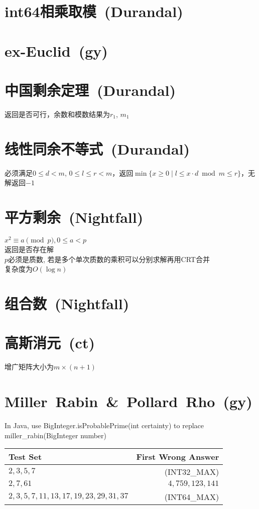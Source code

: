 \section{int64相乘取模\ \small(Durandal)}
\section{ex-Euclid\ \small(gy)}
\section{中国剩余定理\ \small(Durandal)}
	返回是否可行，余数和模数结果为$ r_1 $, $ m_1 $
\section{线性同余不等式\ \small(Durandal)}
	必须满足$ 0 \leq d < m $, $ 0 \leq l \leq r < m $，返回$ \min\lbrace x \geq 0 \mid l \leq x \cdot d \bmod m \leq r \rbrace $，无解返回$ -1 $ 
\section{平方剩余\ \small(Nightfall)}
	$ x^2 \equiv a \pmod p, 0 \leq a < p $
	\\返回是否存在解
	\\$ p $必须是质数, 若是多个单次质数的乘积可以分别求解再用CRT合并
	\\复杂度为$ O(\log n) $
\section{组合数\ \small(Nightfall)}
\section{高斯消元\ \small(ct)}
	增广矩阵大小为$ m \times (n + 1) $
\section{Miller\ Rabin\ \&\ Pollard\ Rho\ \small(gy)}
	In Java, use BigInteger.isProbablePrime(int certainty) to replace miller\_rabin(BigInteger number)\\
	\begin{tabular}{l r}
		\hline
		Test Set & First Wrong Answer\\\hline
		$ 2, 3, 5, 7 $ & (INT32\_MAX)\\\hline
		$ 2, 7, 61 $ & $ 4,759,123,141 $\\\hline
		$ 2, 3, 5, 7, 11, 13, 17, 19, 23, 29, 31, 37 $ & (INT64\_MAX)\\\hline
	\end{tabular}

